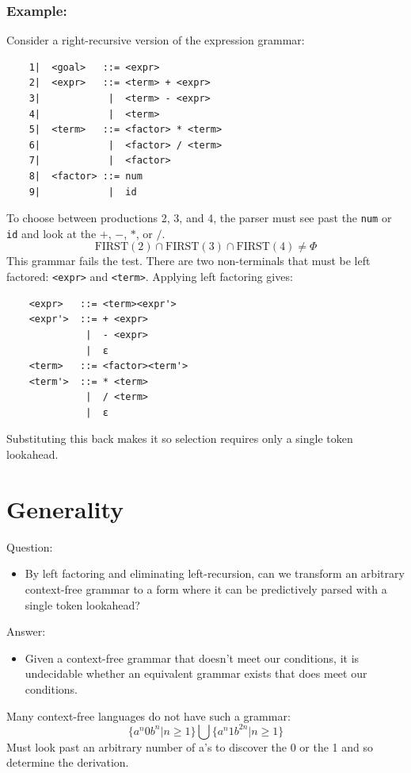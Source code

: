 \documentclass[10pt]{article}
\begin{document}
\subsubsection*{Example:}
Consider a right-recursive version of the expression grammar:
\begin{verbatim}
    1|  <goal>   ::= <expr>
    2|  <expr>   ::= <term> + <expr>
    3|            |  <term> - <expr>
    4|            |  <term>
    5|  <term>   ::= <factor> * <term>
    6|            |  <factor> / <term>
    7|            |  <factor>
    8|  <factor> ::= num
    9|            |  id
\end{verbatim}
To choose between productions 2, 3, and 4, the parser must see past the \texttt{num} or \texttt{id} and look at the $+$, $-$, $*$, or $/$.
\[\text{FIRST}(2) \cap \text{FIRST}(3) \cap \text{FIRST}(4) \neq \Phi\]
This grammar fails the test.  There are two non-terminals that must be left factored: \texttt{<expr>} and \texttt{<term>}.
Applying left factoring gives:
\begin{verbatim}
    <expr>   ::= <term><expr'>
    <expr'>  ::= + <expr>
              |  - <expr>
              |  ε
    <term>   ::= <factor><term'>
    <term'>  ::= * <term>
              |  / <term>
              |  ε
\end{verbatim}
Substituting this back makes it so selection requires only a single token lookahead.

\section*{Generality}
Question:\\
\begin{itemize}
    \item By left factoring and eliminating left-recursion, can we transform an arbitrary context-free grammar to a form where it can be predictively parsed with a single token lookahead?
\end{itemize}
Answer:\\
\begin{itemize}
    \item Given a context-free grammar that doesn't meet our conditions, it is undecidable whether an equivalent grammar exists that does meet our conditions.
\end{itemize}
Many context-free languages do not have such a grammar:
\[\{a^n 0 b^n \vert n \geq 1\} \bigcup \{a^n 1 b^{2n} \vert n \geq 1\}\]
Must look past an arbitrary number of a's to discover the 0 or the 1 and so determine the derivation.
\end{document}

